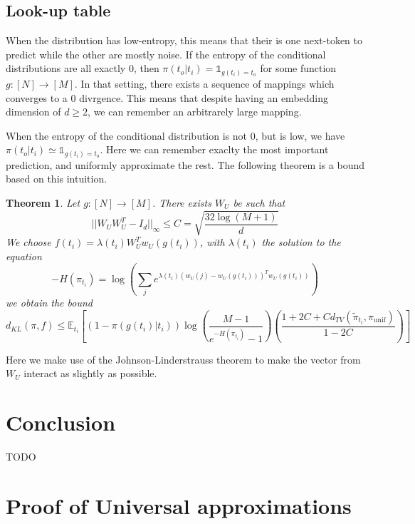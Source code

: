 \documentclass{article}
\newtheorem{theorem}{Theorem}
\begin{document}
\subsection{Look-up table}

When the distribution has low-entropy, this means that their is one next-token to predict while the other are mostly noise. 
If the entropy of the conditional distributions are all exactly 0, then $\pi({t_o}|{t_i}) = \mathbb{1}_{g({t_i})={t_o}}$ for some 
function $g: [N]\rightarrow [M]$. 
In that setting, there exists a sequence of mappings which converges to a 0 divrgence.
This means that despite having an embedding dimension of $d\geq 2$, we can remember an arbitrarely large mapping.
\bigbreak

When the entropy of the conditional distribution is not 0, but is low, we have $\pi({t_o}|{t_i}) \simeq \mathbb{1}_{g({t_i})={t_o}}$. 
Here we can remember exaclty the most important prediction, and uniformly approximate the rest. The following theorem is a bound based 
on this intuition.
\bigbreak

\begin{theorem}
    Let $g:[N] \rightarrow [M]$. There exists $W_U$ be such that \[||W_UW_U^T-I_d||_{\infty} \leq C = \sqrt{\frac{32\log(M+1)}{d}}\]
    We choose $f({t_i}) = \lambda({t_i})W_U^Tw_U(g({t_i}))$, with $\lambda({t_i})$ the solution to the equation 
    \[-H(\pi_{t_i}) = \log\left(\sum_je^{\lambda({t_i})(w_U(j)-w_U(g({t_i})))^Tw_U(g({t_i}))}\right)\] 
    we obtain the bound 
    \[d_{KL}(\pi, f) \leq \mathbb{E}_{t_i}\left[(1-\pi(g({t_i})|{t_i}))\log\left(\frac{M-1}{e^{-H(\pi_{t_i})}-1}\right)
    \left(\frac{1+2C+Cd_{TV}(\tilde{\pi}_{t_i}, \pi_{\text{unif}})}{1-2C}\right)\right]\]
\end{theorem}
\bigbreak

Here we make use of the Johnson-Linderstrauss theorem to make the vector from $W_U$ interact as slightly as possible.

\section{Conclusion}
TODO


\newpage



\appendix




\section{Proof of Universal approximations}
\end{document}
